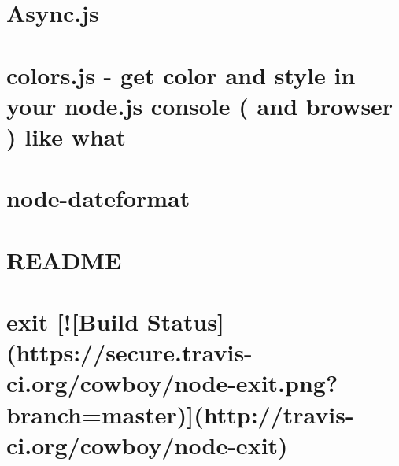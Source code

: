 \documentclass[twoside]{book}
\newcommand{\+}{\discretionary{\mbox{\scriptsize$\hookleftarrow$}}{}{}}
\begin{document}
\chapter{Async.\+js}
\label{md__c_1__users_martin__documents__git_hub_visual_studio__bachelor__wis_r__wis_r_node_modules_grud3a0fd0ea5c53cc7669fbb92e5fda9f7}
\hypertarget{md__c_1__users_martin__documents__git_hub_visual_studio__bachelor__wis_r__wis_r_node_modules_grud3a0fd0ea5c53cc7669fbb92e5fda9f7}{}

\chapter{colors.\+js -\/ get color and style in your node.\+js console ( and browser ) like what}
\label{md__c_1__users_martin__documents__git_hub_visual_studio__bachelor__wis_r__wis_r_node_modules_grunt_node_modules_colors__read_me}
\hypertarget{md__c_1__users_martin__documents__git_hub_visual_studio__bachelor__wis_r__wis_r_node_modules_grunt_node_modules_colors__read_me}{}

\chapter{node-\/dateformat}
\label{md__c_1__users_martin__documents__git_hub_visual_studio__bachelor__wis_r__wis_r_node_modules_grud8f19f62ff9c4620430f36de352900c5}
\hypertarget{md__c_1__users_martin__documents__git_hub_visual_studio__bachelor__wis_r__wis_r_node_modules_grud8f19f62ff9c4620430f36de352900c5}{}

\chapter{R\+E\+A\+D\+M\+E}
\label{md__c_1__users_martin__documents__git_hub_visual_studio__bachelor__wis_r__wis_r_node_modules_grue2b2adf23147874fec6316b600870e28}
\hypertarget{md__c_1__users_martin__documents__git_hub_visual_studio__bachelor__wis_r__wis_r_node_modules_grue2b2adf23147874fec6316b600870e28}{}

\chapter{exit \mbox{[}!\mbox{[}Build Status\mbox{]}(https\+://secure.travis-\/ci.org/cowboy/node-\/exit.png?branch=master)\mbox{]}(http\+://travis-\/ci.org/cowboy/node-\/exit)}
\label{md__c_1__users_martin__documents__git_hub_visual_studio__bachelor__wis_r__wis_r_node_modules_gru92d494bac26fe912b2544419a074767c}
\hypertarget{md__c_1__users_martin__documents__git_hub_visual_studio__bachelor__wis_r__wis_r_node_modules_gru92d494bac26fe912b2544419a074767c}{}

\end{document}
